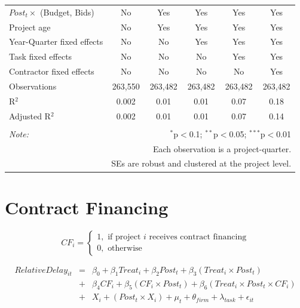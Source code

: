 \documentclass[
]{article}
\begin{document}
\begin{table}[H]
\begin{tabular}{@{\extracolsep{-2pt}}lccccc}
$Post_t \times$  (Budget, Bids) & No & Yes & Yes & Yes & Yes \\ 
Project age & No & Yes & Yes & Yes & Yes \\ 
Year-Quarter fixed effects & No & No & Yes & Yes & Yes \\ 
Task fixed effects & No & No & No & Yes & Yes \\ 
Contractor fixed effects & No & No & No & No & Yes \\ 
Observations & 263,550 & 263,482 & 263,482 & 263,482 & 263,482 \\ 
R$^{2}$ & 0.002 & 0.01 & 0.01 & 0.07 & 0.18 \\ 
Adjusted R$^{2}$ & 0.002 & 0.01 & 0.01 & 0.07 & 0.14 \\ 
\hline 
\hline \\[-1.8ex] 
\textit{Note:}  & \multicolumn{5}{r}{$^{*}$p$<$0.1; $^{**}$p$<$0.05; $^{***}$p$<$0.01} \\ 
 & \multicolumn{5}{r}{Each observation is a project-quarter.} \\ 
 & \multicolumn{5}{r}{SEs are robust and clustered at the project level.} \\ 
\end{tabular} 
\end{table}

\hypertarget{contract-financing}{%
\section{Contract Financing}\label{contract-financing}}

\[ CF_i = \begin{cases} 1, \text{ if project } i \text{ receives contract financing}\\
0, \text{ otherwise} \end{cases}\]

\[ \begin{aligned}
RelativeDelay_{it} &=& \beta_0+\beta_1 Treat_i + \beta_2 Post_t + \beta_3 (Treat_i \times Post_t) \\
&+&\beta_4 CF_i + \beta_5 (CF_i \times Post_t) + \beta_6 (Treat_i \times Post_t \times CF_i) \\ 
&+&X_i + (Post_t \times X_i) + \mu_t + \theta_{firm} + \lambda_{task}+ \epsilon_{it}
\end{aligned}\]
\end{document}
